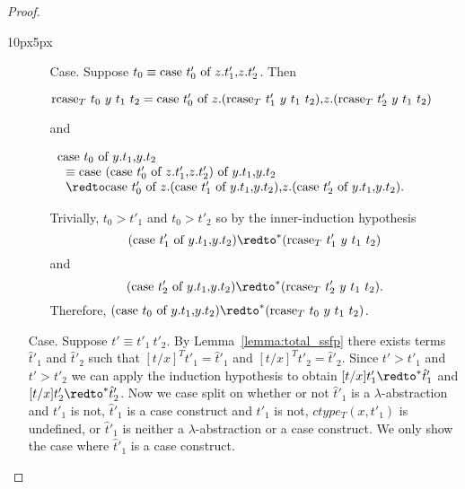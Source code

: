 \begin{proof}
\begin{changemargin}{10px}{5px}
\begin{itemize}
\begin{itemize}
    \item[Case.] Suppose $t_0 \equiv \mbox{case}\ t'_0\ \text{of}\ z\text{.}t'_1\text{,}z\text{.}t'_2$.  Then 
      \begin{center}
        \begin{math}
          \mbox{rcase}_{T}\ t_0\ y\ t_1\ t_2 = 
          \mbox{case}\ t'_0\ \text{of}\ z\text{.}(\mbox{rcase}_{T}\ t'_1\ y\ t_1\ t_2)\text{,}z\text{.}(\mbox{rcase}_{T}\ t'_2\ y\ t_1\ t_2)
        \end{math}
      \end{center}
      and
      \begin{center}
        \begin{math}
          \begin{array}{lll}
            \ccon{t_0}{y}{t_1}{t_2} \\
            \,\,\,\,\equiv  \ccon{(\ccon{t'_0}{z}{t'_1}{t'_2})}{y}{t_1}{t_2}\\
            \,\,\,\,\redto \ccon{t'_0}{z}{(\ccon{t'_1}{y}{t_1}{t_2})}{(\ccon{t'_2}{y}{t_1}{t_2})}.
          \end{array}
        \end{math}
      \end{center}
      Trivially, $t_0 > t'_1$ and $t_0 > t'_2$ so by the inner-induction hypothesis \\
      \[ (\ccon{t'_1}{y}{t_1}{t_2}) \redto^* (\rcase{T}{t'_1}{y}{t_1}{t_2})\] and 
      \[(\ccon{t'_2}{y}{t_1}{t_2}) \redto^* (\rcase{T}{t'_2}{y}{t_1}{t_2}).\]  Therefore,
      $(\ccon{t_0}{y}{t_1}{t_2}) \redto^* (\rcase{T}{t_0}{y}{t_1}{t_2})$.
    \end{itemize}
    
  \item[Case.] Suppose $t' \equiv t'_1\ t'_2$.  By Lemma~\ref{lemma:total_ssfp}
    there exists terms $\hat{t}'_1$ and $\hat{t}'_2$
    such that $[t/x]^T t'_1 = \hat{t}'_1$ and $[t/x]^T t'_2 = \hat{t}'_2$.  Since
    $t' > t'_1$ and $t' > t'_2$ we can apply the induction hypothesis to obtain
    $[t/x]t'_1 \redto^* \hat{t}'_1$ and $[t/x]t'_2 \redto^* \hat{t}'_2$.  Now we case
    split on whether or not $\hat{t}'_1$ is a $\lambda$-abstraction and $t'_1$ is not, $\hat{t}'_1$ is a case construct and
    $t'_1$ is not, $ctype_T(x,t'_1)$ is undefined, or $\hat{t}'_1$ is neither a $\lambda$-abstraction or a case construct.  
    We only show the case where $\hat{t}'_1$ is a case construct.


\end{itemize}
\end{changemargin}
\end{proof}
